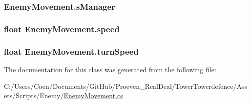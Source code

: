 \subsubsection[{\texorpdfstring{s\+Manager}{sManager}}]{ Enemy\+Movement.\+s\+Manager}\hypertarget{class_enemy_movement_aefd26d9ba8e601679eb4ca36476a8d91}{}\label{class_enemy_movement_aefd26d9ba8e601679eb4ca36476a8d91}
\subsubsection[{\texorpdfstring{speed}{speed}}]{\setlength{\rightskip}{0pt plus 5cm}float Enemy\+Movement.\+speed}\hypertarget{class_enemy_movement_a10af9877c4abb972cfecbc3e284e742d}{}\label{class_enemy_movement_a10af9877c4abb972cfecbc3e284e742d}
\subsubsection[{\texorpdfstring{turn\+Speed}{turnSpeed}}]{\setlength{\rightskip}{0pt plus 5cm}float Enemy\+Movement.\+turn\+Speed}\hypertarget{class_enemy_movement_aae88c55b04b5126ab249117397f247d2}{}\label{class_enemy_movement_aae88c55b04b5126ab249117397f247d2}


The documentation for this class was generated from the following file\+:\begin{DoxyCompactItemize}
\item 
C\+:/\+Users/\+Coen/\+Documents/\+Git\+Hub/\+Proeven\+\_\+\+Real\+Deal/\+Tower\+Towerdefence/\+Assets/\+Scripts/\+Enemy/\hyperlink{_enemy_movement_8cs}{Enemy\+Movement.\+cs}\end{DoxyCompactItemize}

